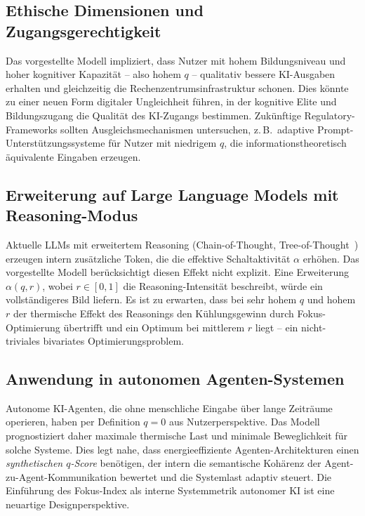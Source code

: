 ﻿\documentclass[a4paper,12pt]{article}
\theoremstyle{definition}
\begin{document}
\subsection{Ethische Dimensionen und Zugangsgerechtigkeit}

Das vorgestellte Modell impliziert, dass Nutzer mit hohem Bildungsniveau und hoher
kognitiver Kapazität -- also hohem $q$ -- qualitativ bessere KI-Ausgaben erhalten und
gleichzeitig die Rechenzentrumsinfrastruktur schonen. Dies könnte zu einer neuen Form
digitaler Ungleichheit führen, in der kognitive Elite und Bildungszugang die Qualität
des KI-Zugangs bestimmen. Zukünftige Regulatory-Frameworks sollten Ausgleichsmechanismen
untersuchen, z.\,B.\ adaptive Prompt-Unterstützungssysteme für Nutzer mit niedrigem $q$,
die informationstheoretisch äquivalente Eingaben erzeugen.

\subsection{Erweiterung auf Large Language Models mit Reasoning-Modus}

Aktuelle LLMs mit erweitertem Reasoning (Chain-of-Thought, Tree-of-Thought~\cite{Wei2022})
erzeugen intern zusätzliche Token, die die effektive Schaltaktivität $\alpha$ erhöhen.
Das vorgestellte Modell berücksichtigt diesen Effekt nicht explizit. Eine Erweiterung
$\alpha(q, r)$, wobei $r \in [0,1]$ die Reasoning-Intensität beschreibt, würde ein
vollständigeres Bild liefern. Es ist zu erwarten, dass bei sehr hohem $q$ und hohem $r$
der thermische Effekt des Reasonings den Kühlungsgewinn durch Fokus-Optimierung übertrifft
und ein Optimum bei mittlerem $r$ liegt -- ein nicht-triviales bivariates Optimierungsproblem.

\subsection{Anwendung in autonomen Agenten-Systemen}

Autonome KI-Agenten, die ohne menschliche Eingabe über lange Zeiträume operieren, haben
per Definition $q = 0$ aus Nutzerperspektive. Das Modell prognostiziert daher maximale
thermische Last und minimale Beweglichkeit für solche Systeme. Dies legt nahe, dass
energieeffiziente Agenten-Architekturen einen \emph{synthetischen $q$-Score} benötigen,
der intern die semantische Kohärenz der Agent-zu-Agent-Kommunikation bewertet und die
Systemlast adaptiv steuert. Die Einführung des Fokus-Index als interne Systemmetrik
autonomer KI ist eine neuartige Designperspektive.
\end{document}
